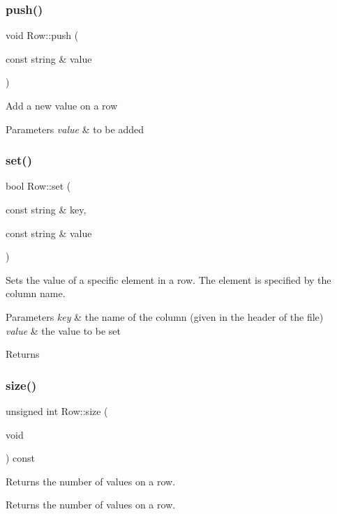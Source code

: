 \subsubsection{push()}
{\footnotesize\ttfamily void Row\+::push (\begin{DoxyParamCaption}\item[{const string \&}]{value }\end{DoxyParamCaption})}

Add a new value on a row 
\begin{DoxyParams}{Parameters}
{\em value} & to be added \\
\hline
\end{DoxyParams}
\mbox{\label{class_row_a74ab22cc8f79c7a1c87da8fefae0d834}} 
\subsubsection{set()}
{\footnotesize\ttfamily bool Row\+::set (\begin{DoxyParamCaption}\item[{const string \&}]{key,  }\item[{const string \&}]{value }\end{DoxyParamCaption})}

Sets the value of a specific element in a row. The element is specified by the column name. 
\begin{DoxyParams}{Parameters}
{\em key} & the name of the column (given in the header of the file) \\
\hline
{\em value} & the value to be set \\
\hline
\end{DoxyParams}
\begin{DoxyReturn}{Returns}

\end{DoxyReturn}
\mbox{\label{class_row_ac3dce6d0bd64e944a932a5a26c3ebcef}} 
\subsubsection{size()}
{\footnotesize\ttfamily unsigned int Row\+::size (\begin{DoxyParamCaption}\item[{void}]{ }\end{DoxyParamCaption}) const}

Returns the number of values on a row. \begin{DoxyReturn}{Returns}
the number of values on a row. 
\end{DoxyReturn}


